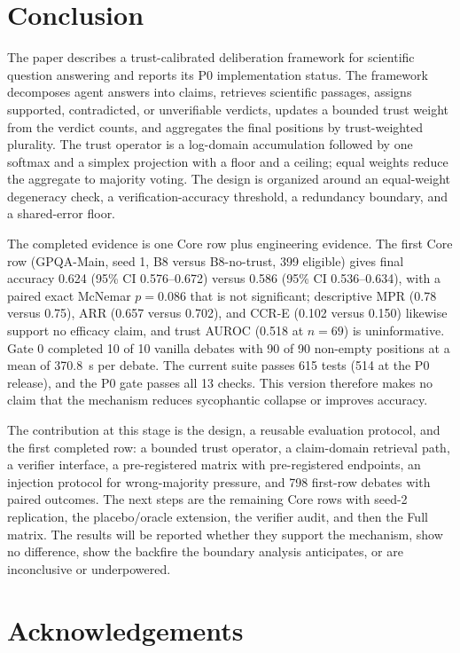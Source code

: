 \documentclass[a4paper,fleqn]{cas-sc}
\begin{document}
\section{Conclusion}

The paper describes a trust-calibrated deliberation framework for scientific question answering and reports its P0 implementation status. The framework decomposes agent answers into claims, retrieves scientific passages, assigns supported, contradicted, or unverifiable verdicts, updates a bounded trust weight from the verdict counts, and aggregates the final positions by trust-weighted plurality. The trust operator is a log-domain accumulation followed by one softmax and a simplex projection with a floor and a ceiling; equal weights reduce the aggregate to majority voting. The design is organized around an equal-weight degeneracy check, a verification-accuracy threshold, a redundancy boundary, and a shared-error floor.

The completed evidence is one Core row plus engineering evidence. The first Core row (GPQA-Main, seed 1, B8 versus B8-no-trust, 399 eligible) gives final accuracy 0.624 (95\% CI 0.576--0.672) versus 0.586 (95\% CI 0.536--0.634), with a paired exact McNemar $p=0.086$ that is not significant; descriptive MPR (0.78 versus 0.75), ARR (0.657 versus 0.702), and CCR-E (0.102 versus 0.150) likewise support no efficacy claim, and trust AUROC (0.518 at $n=69$) is uninformative. Gate 0 completed 10 of 10 vanilla debates with 90 of 90 non-empty positions at a mean of 370.8~s per debate. The current suite passes 615 tests (514 at the P0 release), and the P0 gate passes all 13 checks. This version therefore makes no claim that the mechanism reduces sycophantic collapse or improves accuracy.

The contribution at this stage is the design, a reusable evaluation protocol, and the first completed row: a bounded trust operator, a claim-domain retrieval path, a verifier interface, a pre-registered matrix with pre-registered endpoints, an injection protocol for wrong-majority pressure, and 798 first-row debates with paired outcomes. The next steps are the remaining Core rows with seed-2 replication, the placebo/oracle extension, the verifier audit, and then the Full matrix. The results will be reported whether they support the mechanism, show no difference, show the backfire the boundary analysis anticipates, or are inconclusive or underpowered.

\section*{Acknowledgements}
\end{document}
